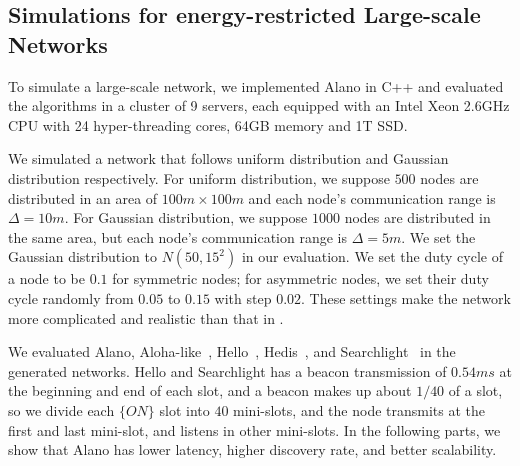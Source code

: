\subsection{Simulations for energy-restricted Large-scale Networks}


To simulate a large-scale network, we implemented Alano in C++ and evaluated the algorithms in a cluster of 9 servers,
each equipped with an Intel Xeon 2.6GHz CPU with 24 hyper-threading cores, 64GB memory and 1T SSD.

We simulated a network that follows uniform distribution and Gaussian distribution respectively.
For uniform distribution, we suppose $500$ nodes are distributed in an area of $100m \times 100m$ 
and each node's communication range is $\Delta = 10m$. For Gaussian distribution, we suppose 
$1000$ nodes are distributed in the same area, but each node's communication range is $\Delta = 5m$. 
We set the Gaussian distribution to $N(50,15^2)$ in our evaluation.
We set the duty cycle of a node to be $0.1$ for symmetric nodes; 
for asymmetric nodes, we set their duty cycle randomly from $0.05$ to $0.15$ with step $0.02$.
These settings make the network more complicated and realistic than that in
\cite{wang2015blinddate, sun2014hello, bakht2012searchlight,
chen2015heterogeneous, kandhalu2010u, you2011aloha,
mcglynn2001birthday, song2014probabilistic, vasudevan2009neighbor}.


We evaluated Alano, Aloha-like~\cite{you2011aloha}, Hello~\cite{sun2014hello}, Hedis~\cite{chen2015heterogeneous}, and Searchlight~\cite{bakht2012searchlight} in the generated networks. %
Hello and Searchlight has a beacon transmission of $0.54ms$ at the beginning and end of each slot, and a beacon makes up about $1/40$ of a slot, so we divide each $\{ON\}$ slot into $40$ mini-slots, and the node transmits at the first and last mini-slot, and listens in other mini-slots.
In the following parts, we show that Alano has lower latency, higher discovery rate, and better scalability. %




